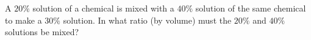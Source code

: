 A $20\%$ solution of a chemical is mixed with a $40\%$ solution of the same chemical to make a $30\%$ solution. In what ratio (by volume) must the $20\%$ and $40\%$ solutions be mixed?
